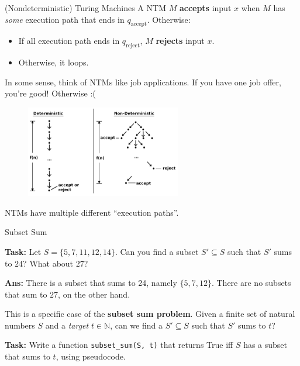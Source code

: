 \documentclass{beamer}
\begin{document}
\begin{frame}{(Nondeterministic) Turing Machines}
A NTM $M$ \textbf{accepts} input $x$ when $M$ has \textit{some} execution path that ends in $q_{\text{accept}}$. Otherwise:
\begin{itemize}
    \item If all execution path ends in $q_{\text{reject}}$, $M$ \textbf{rejects} input $x$.
    \item Otherwise, it loops.
\end{itemize}

In some sense, think of NTMs like job applications. If you have one job offer, you're good! Otherwise :(

\begin{figure}[h]
    \centering
    \includegraphics[height=4cm]{img/NTM.png}
\end{figure}
NTMs have multiple different ``execution paths''.
\end{frame}

\begin{frame}{Subset Sum}

\textbf{Task:} Let $S = \{5, 7, 11, 12, 14\}$. Can you find a subset $S' \subseteq S$ such that $S'$ sums to $24$? What about $27$?

\pause

\textbf{Ans:} There is a subset that sums to 24, namely $\{5, 7, 12\}$. There are no subsets that sum to $27$, on the other hand.

\vspace{2mm}

\pause

This is a specific case of the \textbf{subset sum problem}. Given a finite set of natural numbers $S$ and a \textit{target} $t \in \mathbb N$, can we find a $S' \subseteq S$ such that $S'$ sums to $t$?

\pause
\vspace{2mm}

\textbf{Task:} Write a function \texttt{subset\_sum(S, t)} that returns True iff $S$ has a subset that sums to $t$, using pseudocode.

\end{frame}
\end{document}
